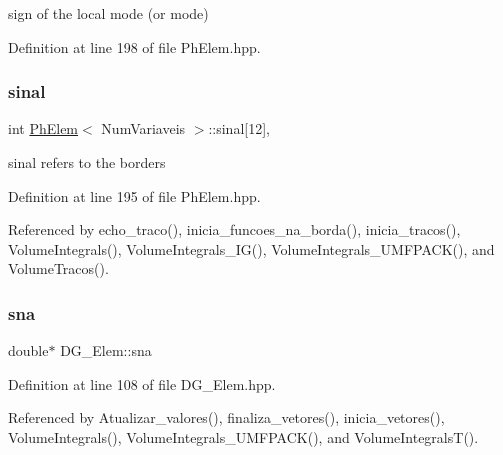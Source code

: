 sign of the local mode (or mode) 



Definition at line 198 of file Ph\+Elem.\+hpp.

\mbox{\label{classPhElem_a4034b9b2a458d1277ca74e4e8a49627e}} 
\subsubsection{\texorpdfstring{sinal}{sinal}}
{\footnotesize\ttfamily int \hyperlink{classPhElem}{Ph\+Elem}$<$ Num\+Variaveis $>$\+::sinal\mbox{[}12\mbox{]}\hspace{0.3cm}{\ttfamily [protected]}, {\ttfamily [inherited]}}



sinal refers to the borders 



Definition at line 195 of file Ph\+Elem.\+hpp.



Referenced by echo\+\_\+traco(), inicia\+\_\+funcoes\+\_\+na\+\_\+borda(), inicia\+\_\+tracos(), Volume\+Integrals(), Volume\+Integrals\+\_\+\+I\+G(), Volume\+Integrals\+\_\+\+U\+M\+F\+P\+A\+C\+K(), and Volume\+Tracos().

\mbox{\label{classDG__Elem_ac036921322e2a7d3648723ae77592af5}} 
\subsubsection{\texorpdfstring{sna}{sna}}
{\footnotesize\ttfamily double$\ast$ D\+G\+\_\+\+Elem\+::sna\hspace{0.3cm}{\ttfamily [private]}}



Definition at line 108 of file D\+G\+\_\+\+Elem.\+hpp.



Referenced by Atualizar\+\_\+valores(), finaliza\+\_\+vetores(), inicia\+\_\+vetores(), Volume\+Integrals(), Volume\+Integrals\+\_\+\+U\+M\+F\+P\+A\+C\+K(), and Volume\+Integrals\+T().

\mbox{\label{classPhElem_aebcf76eedfef93aef801fa3cab9c2708}} 
